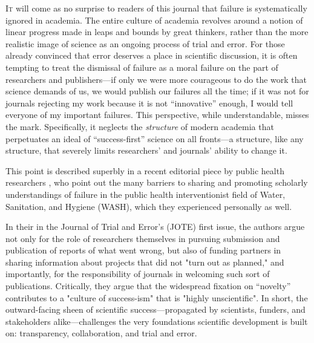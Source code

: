 \documentclass[editorial, authordate,twocolumn,issue]{jote-new-article}
\author[1]{Stefan Gaillard \orcid{https://orcid.org/0000-0003-1956-7325}}
\author[2]{Sean Devine \orcid{https://orcid.org/0000-0002-0445-2763}}
\begin{document}
\begin{frontmatter}

  \maketitle
      
\end{frontmatter}


\lettrine{I}t will come as no surprise to readers of this journal that failure is systematically ignored in academia. The entire culture of academia revolves around a notion of linear progress made in leaps and bounds by great thinkers, rather than the more realistic image of science as an ongoing process of trial and error. For those already convinced that error deserves a place in scientific discussion, it is often tempting to treat the dismissal of failure as a moral failure on the part of researchers and publishers—if only we were more courageous to do the work that science demands of us, we would publish our failures all the time; if it was not for journals rejecting my work because it is not “innovative” enough, I would tell everyone of my important failures. This perspective, while understandable, misses the mark. Specifically, it neglects the \emph{structure }of modern academia that perpetuates an ideal of “success-first” science on all fronts—a structure, like any structure, that severely limits researchers' and journals' ability to change it. 

This point is described superbly in a recent editorial piece by public health researchers \textcite{Sindall2020}, who point out the many barriers to sharing and promoting scholarly understandings of failure in the public health interventionist field of Water, Sanitation, and Hygiene (WASH), which they experienced personally as well. 

In their  in the Journal of Trial and Error's (JOTE) first issue, the authors argue not only for the role of researchers themselves in pursuing submission and publication of reports of what went wrong, but also of funding partners in sharing information about projects that did not "turn out as planned," and importantly, for the responsibility of journals in welcoming such sort of publications. Critically, they argue that the widespread fixation on “novelty” contributes to a "culture of success-ism" that is "highly unscientific". In short, the outward-facing sheen of scientific success—propagated by scientists, funders, and stakeholders alike—challenges the very foundations scientific development is built on: transparency, collaboration, and trial and error.
\end{document}
